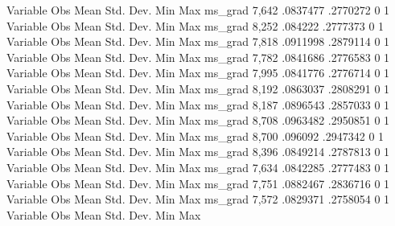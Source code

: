 {\smallskip}
    Variable {\VBAR}        Obs        Mean    Std. Dev.       Min        Max
     ms_grad {\VBAR}      7,642    .0837477    .2770272          0          1
{\smallskip}
    Variable {\VBAR}        Obs        Mean    Std. Dev.       Min        Max
     ms_grad {\VBAR}      8,252     .084222    .2777373          0          1
{\smallskip}
    Variable {\VBAR}        Obs        Mean    Std. Dev.       Min        Max
     ms_grad {\VBAR}      7,818    .0911998    .2879114          0          1
{\smallskip}
    Variable {\VBAR}        Obs        Mean    Std. Dev.       Min        Max
     ms_grad {\VBAR}      7,782    .0841686    .2776583          0          1
{\smallskip}
    Variable {\VBAR}        Obs        Mean    Std. Dev.       Min        Max
     ms_grad {\VBAR}      7,995    .0841776    .2776714          0          1
{\smallskip}
    Variable {\VBAR}        Obs        Mean    Std. Dev.       Min        Max
     ms_grad {\VBAR}      8,192    .0863037    .2808291          0          1
{\smallskip}
    Variable {\VBAR}        Obs        Mean    Std. Dev.       Min        Max
     ms_grad {\VBAR}      8,187    .0896543    .2857033          0          1
{\smallskip}
    Variable {\VBAR}        Obs        Mean    Std. Dev.       Min        Max
     ms_grad {\VBAR}      8,708    .0963482    .2950851          0          1
{\smallskip}
    Variable {\VBAR}        Obs        Mean    Std. Dev.       Min        Max
     ms_grad {\VBAR}      8,700     .096092    .2947342          0          1
{\smallskip}
    Variable {\VBAR}        Obs        Mean    Std. Dev.       Min        Max
     ms_grad {\VBAR}      8,396    .0849214    .2787813          0          1
{\smallskip}
    Variable {\VBAR}        Obs        Mean    Std. Dev.       Min        Max
     ms_grad {\VBAR}      7,634    .0842285    .2777483          0          1
{\smallskip}
    Variable {\VBAR}        Obs        Mean    Std. Dev.       Min        Max
     ms_grad {\VBAR}      7,751    .0882467    .2836716          0          1
{\smallskip}
    Variable {\VBAR}        Obs        Mean    Std. Dev.       Min        Max
     ms_grad {\VBAR}      7,572    .0829371    .2758054          0          1
{\smallskip}
    Variable {\VBAR}        Obs        Mean    Std. Dev.       Min        Max
